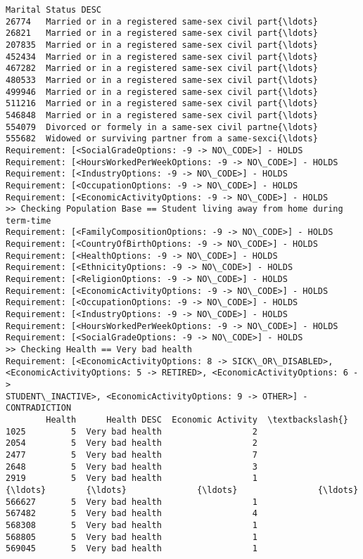 \documentclass[11pt]{article}
\begin{document}
\begin{Verbatim}[commandchars=\\\{\}]
                                      Marital Status DESC
26774   Married or in a registered same-sex civil part{\ldots}
26821   Married or in a registered same-sex civil part{\ldots}
207835  Married or in a registered same-sex civil part{\ldots}
452434  Married or in a registered same-sex civil part{\ldots}
467282  Married or in a registered same-sex civil part{\ldots}
480533  Married or in a registered same-sex civil part{\ldots}
499946  Married or in a registered same-sex civil part{\ldots}
511216  Married or in a registered same-sex civil part{\ldots}
546848  Married or in a registered same-sex civil part{\ldots}
554079  Divorced or formely in a same-sex civil partne{\ldots}
555682  Widowed or surviving partner from a same-sexci{\ldots}
Requirement: [<SocialGradeOptions: -9 -> NO\_CODE>] - HOLDS
Requirement: [<HoursWorkedPerWeekOptions: -9 -> NO\_CODE>] - HOLDS
Requirement: [<IndustryOptions: -9 -> NO\_CODE>] - HOLDS
Requirement: [<OccupationOptions: -9 -> NO\_CODE>] - HOLDS
Requirement: [<EconomicActivityOptions: -9 -> NO\_CODE>] - HOLDS
>> Checking Population Base == Student living away from home during term-time
Requirement: [<FamilyCompositionOptions: -9 -> NO\_CODE>] - HOLDS
Requirement: [<CountryOfBirthOptions: -9 -> NO\_CODE>] - HOLDS
Requirement: [<HealthOptions: -9 -> NO\_CODE>] - HOLDS
Requirement: [<EthnicityOptions: -9 -> NO\_CODE>] - HOLDS
Requirement: [<ReligionOptions: -9 -> NO\_CODE>] - HOLDS
Requirement: [<EconomicActivityOptions: -9 -> NO\_CODE>] - HOLDS
Requirement: [<OccupationOptions: -9 -> NO\_CODE>] - HOLDS
Requirement: [<IndustryOptions: -9 -> NO\_CODE>] - HOLDS
Requirement: [<HoursWorkedPerWeekOptions: -9 -> NO\_CODE>] - HOLDS
Requirement: [<SocialGradeOptions: -9 -> NO\_CODE>] - HOLDS
>> Checking Health == Very bad health
Requirement: [<EconomicActivityOptions: 8 -> SICK\_OR\_DISABLED>,
<EconomicActivityOptions: 5 -> RETIRED>, <EconomicActivityOptions: 6 ->
STUDENT\_INACTIVE>, <EconomicActivityOptions: 9 -> OTHER>] - CONTRADICTION
        Health      Health DESC  Economic Activity  \textbackslash{}
1025         5  Very bad health                  2
2054         5  Very bad health                  2
2477         5  Very bad health                  7
2648         5  Very bad health                  3
2919         5  Very bad health                  1
{\ldots}        {\ldots}              {\ldots}                {\ldots}
566627       5  Very bad health                  1
567482       5  Very bad health                  4
568308       5  Very bad health                  1
568805       5  Very bad health                  1
569045       5  Very bad health                  1


\end{Verbatim}
\end{document}
